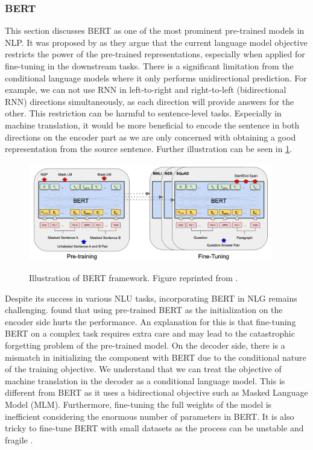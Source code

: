\subsubsection{BERT}
This section discusses BERT as one of the most prominent pre-trained models in NLP. It was proposed by  as they argue that the current language model objective restricts the power of the pre-trained representations, especially when applied for fine-tuning in the downstream tasks. There is a significant limitation from the conditional language models where it only performs unidirectional prediction. For example, we can not use RNN in left-to-right and right-to-left (bidirectional RNN) directions simultaneously, as each direction will provide answers for the other. This restriction can be harmful to sentence-level tasks. Especially in machine translation, it would be more beneficial to encode the sentence in both directions on the encoder part as we are only concerned with obtaining a good representation from the source sentence. Further illustration can be seen in \cref{img:bert}.

\begin{figure}[h]
    {\includegraphics[width=0.95\textwidth]{img/bert.png}}
    \centering
    \caption{Illustration of BERT framework. Figure reprinted from .}
    \label{img:bert}
\end{figure}

Despite its success in various NLU tasks, incorporating BERT in NLG remains challenging.  found that using pre-trained BERT as the initialization on the encoder side hurts the performance. An explanation for this is that fine-tuning BERT on a complex task requires extra care and may lead to the catastrophic forgetting problem  of the pre-trained model. On the decoder side, there is a mismatch in initializing the component with BERT due to the conditional nature of the training objective. We understand that we can treat the objective of machine translation in the decoder as a conditional language model. This is different from BERT as it uses a bidirectional objective such as Masked Language Model (MLM). Furthermore, ﬁne-tuning the full weights of the model is inefficient considering the enormous number of parameters in BERT. It is also tricky to fine-tune BERT with small datasets as the process can be unstable and fragile .

